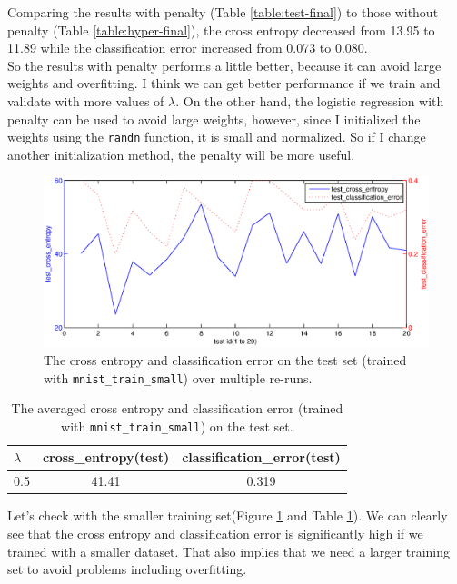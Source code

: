 \documentclass{article}
\begin{document}
Comparing the results with penalty (Table \ref{table:test-final}) to those without penalty (Table \ref{table:hyper-final}), the cross entropy decreased from 13.95 to 11.89 while the classification error increased from 0.073 to 0.080. \\

So the results with penalty performs a little better, because it can avoid large weights and overfitting. I think we can get better performance if we train and validate with more values of $\lambda$. On the other hand, the logistic regression with penalty can be used to avoid large weights, however, since I initialized the weights using the \texttt{randn} function, it is small and normalized. So if I change another initialization method, the penalty will be more useful.\\

\begin{figure}[htb]
\centering
\includegraphics[width=\textwidth]{2-3-test-s.eps}
\caption{The cross entropy and classification error on the test set (trained with \texttt{mnist\_train\_small}) over multiple re-runs.
\label{fig:2-3-test-s}}
\end{figure}

\begin{table}[htbp]
\centering
\begin{tabular}{lcc}
\toprule
$\lambda$ & cross\_entropy(test) & classification\_error(test) \\
\midrule
0.5 & 41.41 & 0.319\\
\bottomrule
\end{tabular}
\caption{The averaged cross entropy and classification error (trained with \texttt{mnist\_train\_small}) on the test set. 
\label{table:test-final-s}}
\end{table}

Let's check with the smaller training set(Figure \ref{fig:2-3-test-s} and Table \ref{table:test-final-s}). We can clearly see that the cross entropy and classification error is significantly high if we trained with a smaller dataset. That also implies that we need a larger training set to avoid problems including overfitting.\\
\end{document}
